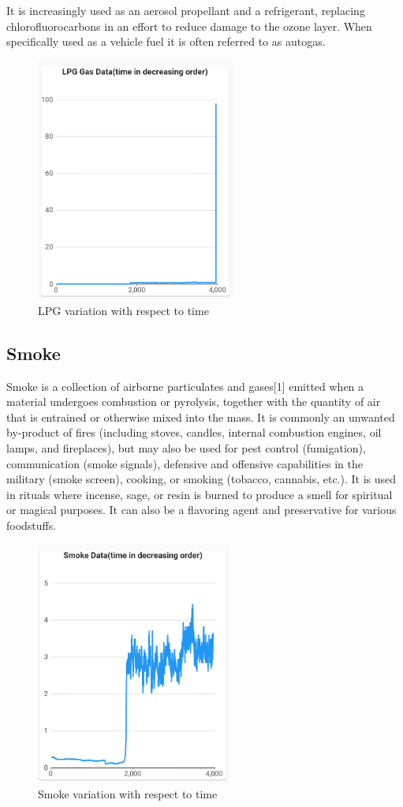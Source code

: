 It is increasingly used as an aerosol propellant and a refrigerant, replacing chlorofluorocarbons in an effort to reduce damage to the ozone layer. When specifically used as a vehicle fuel it is often referred to as autogas.
\begin{figure}[!ht]
\centering
\includegraphics[width=\linewidth,height=8cm]{figures/LPG.png}
\caption{\label{img412} LPG variation with respect to time}
\end{figure}

\subsection{Smoke}
Smoke is a collection of airborne particulates and gases[1] emitted when a material undergoes combustion or pyrolysis, together with the quantity of air that is entrained or otherwise mixed into the mass. It is commonly an unwanted by-product of fires (including stoves, candles, internal combustion engines, oil lamps, and fireplaces), but may also be used for pest control (fumigation), communication (smoke signals), defensive and offensive capabilities in the military (smoke screen), cooking, or smoking (tobacco, cannabis, etc.). It is used in rituals where incense, sage, or resin is burned to produce a smell for spiritual or magical purposes. It can also be a flavoring agent and preservative for various foodstuffs.
\begin{figure}[!ht]
\centering
\includegraphics[width=\linewidth,height=8cm]{figures/smoke.png}
\caption{\label{img413} Smoke variation with respect to time}
\end{figure}


